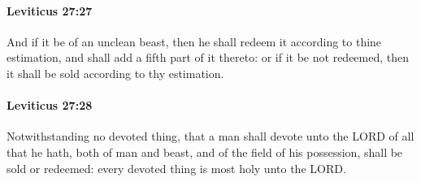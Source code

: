 		\paragraph{Leviticus 27:27} %
			\label{LEVITICUS-27-27}

			And if it be of an unclean beast, then he shall redeem it according to thine estimation, and shall add a fifth part of it thereto: or if it be not redeemed, then it shall be sold according to thy estimation.


		\paragraph{Leviticus 27:28} %
			\label{LEVITICUS-27-28}

			Notwithstanding no devoted thing, that a man shall devote unto the LORD of all that he hath, both of man and beast, and of the field of his possession, shall be sold or redeemed: every devoted thing is most holy unto the LORD.

